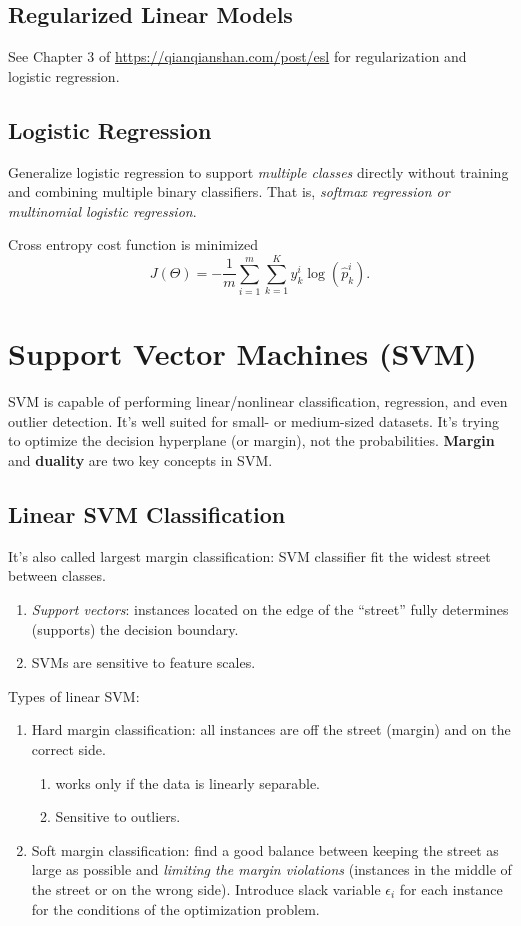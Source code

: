 \documentclass[12pt,oneside,a4paper]{article}
\numberwithin{equation}{section}
\begin{document}
\subsection{Regularized Linear Models}
See Chapter 3 of \href{https://qianqianshan.com/post/elementsofstatisticallearning/}{https://qianqianshan.com/post/esl} for regularization and logistic regression.


\subsection{Logistic Regression}
Generalize logistic regression to support \emph{multiple classes} directly without training and combining multiple binary classifiers. That is, \emph{softmax regression or multinomial logistic regression}.

Cross entropy cost function is minimized 
\begin{equation}
J(\Theta) = - \frac{1}{m} \sum_{i=1}^{m} \sum_{k=1}^{K} y_k^{i} \log (\hat{p}_k^i).
\end{equation}

\section{Support Vector Machines (SVM)}
SVM is capable of performing linear/nonlinear classification, regression, and even outlier detection. It's well suited for small- or medium-sized datasets. It's trying to optimize the decision hyperplane (or margin), not the probabilities. \textbf{Margin} and \textbf{duality} are two key concepts in SVM.

\subsection{Linear SVM Classification}
It's also called largest margin classification: SVM classifier fit the widest street between classes.

\begin{enumerate}
\item \emph{Support vectors}: instances located on the edge of the ``street'' fully determines (supports) the decision boundary. 
\item SVMs are sensitive to feature scales. 
\end{enumerate}
Types of linear SVM:
\begin{enumerate}
\item Hard margin classification: all instances are off the street (margin) and on the correct side. 
\begin{enumerate}
\item works only if the data is linearly separable.
\item Sensitive to outliers.
\end{enumerate}

\item Soft margin classification: find a good balance between keeping the street as large as possible and \emph{limiting the margin violations} (instances in the middle of the street or on the wrong side). Introduce slack variable $\epsilon_i$ for each instance for the conditions of the optimization problem.
\end{enumerate}
\end{document}
